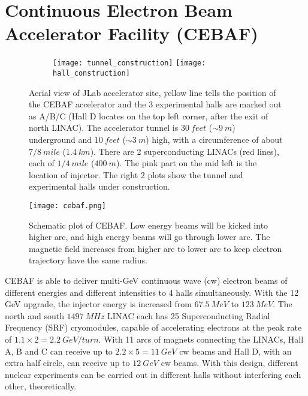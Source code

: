 \section{Continuous Electron Beam Accelerator Facility (CEBAF)}
\begin{figure}[h!]
    \begin{subfigure}[b]{0.59\textwidth}
    \end{subfigure}
    \begin{subfigure}[b]{0.5\textwidth}
	\texttt{[image: tunnel\_construction]}
	\texttt{[image: hall\_construction]}
    \end{subfigure}

    \caption{Aerial view of JLab accelerator site, yellow line tells the position
    of the CEBAF accelerator and the 3 experimental halls are marked out as A/B/C 
    (Hall D locates on the top left corner, after the exit of north LINAC).
    The accelerator tunnel is $30 \ feet$ ($\sim 9 \ m$) underground and $10 \ feet$ ($\sim 3 \ m$) 
    high, with a circumference of about $7/8\ mile$ ($1.4\ km$). There are 2 superconducting 
    LINACs (red lines), each of $1/4\ mile$ ($400\ m$). The pink part on the mid
    left is the location of injector. The right 2 plots show the tunnel and 
    experimental halls under construction.}
\end{figure}

\begin{figure}[h!]
    \texttt{[image: cebaf.png]}
    \caption{Schematic plot of CEBAF. Low energy beams will be kicked into 
    higher arc, and high energy beams will go through lower arc. The magnetic
    field increases from higher arc to lower arc to keep electron trajectory 
    have the same radius.}
    \label{fig:cebaf}
\end{figure}
CEBAF is able to deliver multi-GeV continuous wave (cw) electron beams of different
energies and different intensities to 4 halls simultaneously.
With the 12 GeV upgrade, the injector energy is increased from $67.5\ MeV$ to 
$123\ MeV$. The north and south $1497\ MHz$ LINAC each has 25 
Superconducting Radial Frequency (SRF) cryomodules, capable of accelerating 
electrons at the peak rate of $1.1 \times 2 = 2.2\ GeV/turn$. With 11 arcs of magnets
connecting the LINACs, Hall A, B and C can receive up
to $2.2 \times 5 = 11 \ GeV$ cw beams and Hall D, with an extra half circle,
can receive up to $12\ GeV$ cw beams. With this design, different nuclear 
experiments can be carried out in different halls without interfering each other,
theoretically.

